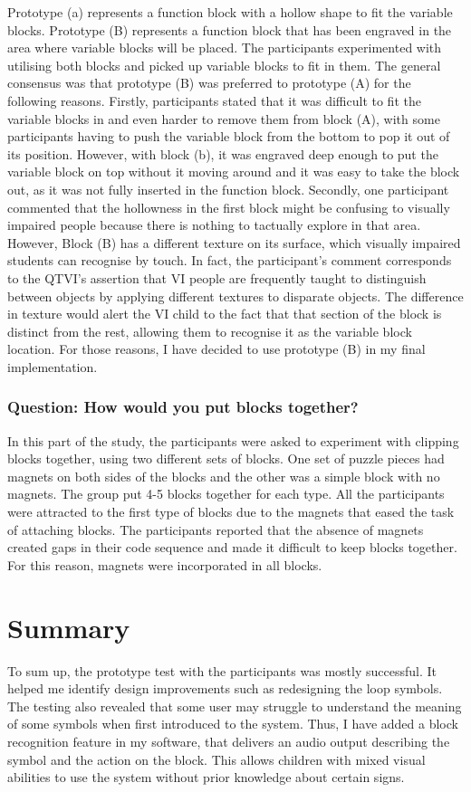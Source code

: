 \documentclass[oneside,%
                    author={Malak Hajji},
                    degree={BSc},
                    title={Designing An Accessible Computational Toolkit For Students},
                  subtitle={With Mixed Visual Abilities}]{dissertation}
\begin{document}
Prototype (a) represents a function block with a hollow shape to fit the variable blocks. Prototype (B) represents a function block that has been engraved in the area where variable blocks will be placed. 
The participants experimented with utilising both blocks and picked up variable blocks to fit in them. 
The general consensus was that prototype (B) was preferred to prototype (A) for the following reasons. Firstly, participants stated that it was difficult to fit the variable blocks in and even harder to remove them from block (A), with some participants having to push the variable block from the bottom to pop it out of its position. However, with block (b), it was engraved deep enough to put the variable block on top without it moving around and it was easy to take the block out, as it was not fully inserted in the function block. Secondly, one participant commented that the hollowness in the first block might be confusing to visually impaired people because there is nothing to tactually explore in that area. However, Block (B) has a different texture on its surface, which visually impaired students can recognise by touch. In fact, the participant's comment corresponds to the QTVI's assertion that VI people are frequently taught to distinguish between objects by applying different textures to disparate objects. The difference in texture would alert the VI child to the fact that that section of the block is distinct from the rest, allowing them to recognise it as the variable block location.
For those reasons, I have decided to use prototype (B) in my final implementation.

\subsubsection{Question: How would you put blocks together?}
In this part of the study, the participants were asked to experiment with clipping blocks together, using two different sets of blocks. One set of puzzle pieces had magnets on both sides of the blocks and the other was a simple block with no magnets.
The group put 4-5 blocks together for each type.
All the participants were attracted to the first type of blocks due to the magnets that eased the task of attaching blocks. The participants reported that the absence of magnets created gaps in their code sequence and made it difficult to keep blocks together. For this reason, magnets were incorporated in all blocks.


\section{Summary}
To sum up, the prototype test with the participants was mostly successful. It helped me identify design improvements such as redesigning the loop symbols. The testing also revealed that some user may struggle to understand the meaning of some symbols when first introduced to the system. Thus, I have added a block recognition feature in my software, that delivers an audio output describing the symbol and the action on the block. This allows children with mixed visual abilities to use the system without prior knowledge about certain signs.
\end{document}
